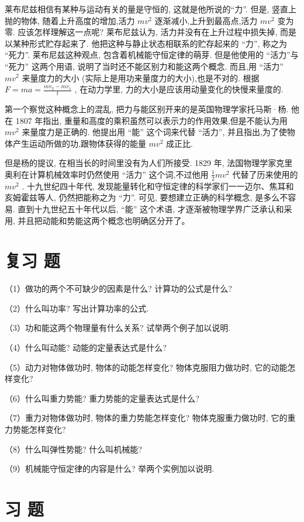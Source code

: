 \documentclass[10pt]{article}
\begin{document}
莱布尼兹相信有某种与运动有关的量是守恒的, 这就是他所说的“力”. 但是, 竖直上抛的物体, 随着上升高度的增加,活力 \(m{v}^{2}\) 逐渐减小,上升到最高点,活力 \(m{v}^{2}\) 变为零. 应该怎样理解这一点呢? 莱布尼兹认为, 活力并没有在上升过程中损失掉, 而是以某种形式贮存起来了. 他把这种与静止状态相联系的贮存起来的 “力”, 称之为 “死力”. 莱布尼兹这种观点, 包含着机械能守恒定律的萌芽. 但是他使用的 “活力”与 “死力” 这两个用语, 说明了当时还不能区别力和能这两个概念. 而且,用 “活力” \(m{v}^{2}\) 来量度力的大小 (实际上是用功来量度力的大小),也是不对的. 根据 \(F = {ma} = \frac{m{v}_{2} - m{v}_{1}}{t}\) , 在动力学里, 力的大小是应该用动量变化的快慢来量度的.

第一个察觉这种概念上的混乱, 把力与能区别开来的是英国物理学家托马斯·杨. 他在 1807 年指出, 重量和高度的乘积虽然可以表示力的作用效果,但是不能认为用 \(m{v}^{2}\) 来量度力是正确的. 他提出用 “能” 这个词来代替 “活力”, 并且指出,为了使物体产生运动所做的功,跟物体获得的能量 \(m{v}^{2}\) 成正比.

但是杨的提议, 在相当长的时间里没有为人们所接受. 1829 年, 法国物理学家克里奥利在计算机械效率时仍然使用 “活力” 这个词,不过他用 \(\frac{1}{2}m{v}^{2}\) 代替了历来使用的 \(m{v}^{2}\) . 十九世纪四十年代, 发现能量转化和守恒定律的科学家们一一迈尔、焦耳和亥姆霍兹等人, 仍然把能称之为 “力”. 可见, 要想建立正确的科学概念, 是多么不容易. 直到十九世纪五十年代以后, “能” 这个术语, 才逐渐被物理学界广泛承认和采用, 并且把动能和势能这两个概念也明确区分开了。

\section*{复习 题}

（1）做功的两个不可缺少的因素是什么? 计算功的公式是什么?

（2）什么叫功率? 写出计算功率的公式.

（3）功和能这两个物理量有什么关系? 试举两个例子加以说明.

（4）什么叫动能? 动能的定量表达式是什么?

（5）动力对物体做功时, 物体的动能怎样变化? 物体克服阻力做功时, 它的动能怎样变化?

（6）什么叫重力势能? 重力势能的定量表达式是什么?

（7）重力对物体做功时, 物体的重力势能怎样变化? 物体克服重力做功时, 它的重力势能怎样变化?

（8）什么叫弹性势能? 什么叫机械能?

（9）机械能守恒定律的内容是什么? 举两个实例加以说明.

\section*{习 题}
\end{document}
